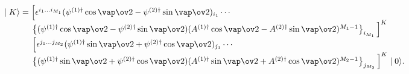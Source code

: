 \begin{equation}
\begin{array}{l}
\label{xvacu}
\mid K \rangle= 
\Big[ \epsilon ^{i_1...i_{M_1}} 
(\psi^{(1)\dag} \cos{\vap\ov 2} - \psi^{(2)\dag}\sin{\vap\ov 2})_{i_1} 
\cdots \\
\qquad \ \ \ ~
\left\{ (\psi^{(1)\dag} \cos{\vap\ov 2} - \psi^{(2)\dag}\sin{\vap\ov 2}) 
(A^{(1)\dag}\cos{\vap\ov 2} 
- A^{(2)\dag} \sin{\vap\ov 2})^{M_1-1}\right\}_{i_{M_1}}\Big]^{K}
\\
\qquad \ \ \ ~
\Big[ \epsilon ^{j_1...j_{M_2}} 
(\psi^{(1)\dag} \sin{\vap\ov 2} + \psi^{(2)\dag}\cos{\vap\ov 2})_{j_1} 
\cdots \\
\qquad \ \ \ ~
\left\{ (\psi^{(1)\dag} \sin{\vap\ov 2} + \psi^{(2)\dag}\cos{\vap\ov 2}) 
(A^{(1)\dag}\sin{\vap\ov 2} 
+ A^{(2)\dag} \cos{\vap\ov 2})^{M_2-1}\right\}_{j_{M_2}}\Big]^{K} \mid 0\rangle.
\end{array}
\end{equation}

